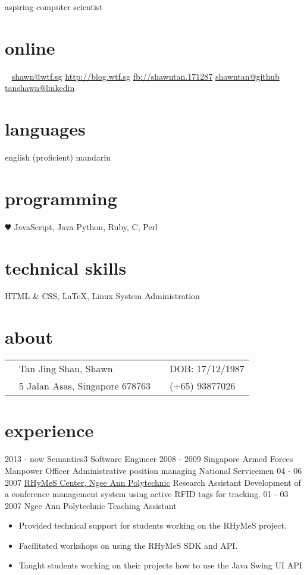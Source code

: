 \documentclass[]{friggeri-cv}
\begin{document}
{aspiring computer scientist}
\begin{aside}
	\section{online}
	\Email~ \href{mailto:shawn@wtf.sg}{shawn@wtf.sg}
	\href{http://blog.wtf.sg}{http://blog.wtf.sg}
	\href{http://facebook.com/shawntan.171287}{fb://shawntan.171287}
	\href{http://github.com/shawntan}{shawntan@github}
	\href{http://sg.linkedin.com/in/tanshawn}{tanshawn@linkedin}
	\section{languages}
	english (proficient)
	mandarin
	\section{programming}
	{\color{red} $\varheartsuit$} JavaScript, Java
	Python, Ruby, C, Perl
	\section{technical skills}
	HTML \& CSS, \LaTeX,
	Linux System Administration
\end{aside}
\section{about}
\begin{tabular}{ p{0.45cm} p{6.5cm} p{0.45cm} p{6.5cm} }
	\Male 	& Tan Jing Shan, Shawn	 & \Sagittarius &  DOB: 17/12/1987\\
	\Letter & 5 Jalan Asas, Singapore 678763 & \Mobilefone & (+65) 93877026 \\
\end{tabular}

\section{experience}

\begin{entrylist}
	\entry
	{2013 - now}
	{Semantics3}
	{Software Engineer}
	{}
	\entry
	{2008 - 2009}
	{Singapore Armed Forces}
	{Manpower Officer}
	{Administrative position managing National Servicemen}
	\entry
	{04 - 06 2007}
	{\href{http://www.np.edu.sg/ict/facilities/rhymes/Pages/loc\_rhymes.aspx}{RHyMeS Center, Ngee Ann Polytechnic}}
	{Research Assistant}
	{Development of a conference management system using active RFID tags for 
	tracking.}
	\entry
	{01 - 03 2007}
	{Ngee Ann Polytechnic}
	{Teaching Assistant}
	{
		\begin{itemize}[itemsep=0pt,topsep=0pt]
			\item Provided technical support for students working on the RHyMeS 
				project.
			\item Facilitated workshops on using the RHyMeS SDK and API.
			\item  Taught students working on their projects how to use the Java 
				Swing UI API
		\end{itemize}
	}
\end{entrylist}
\end{document}
